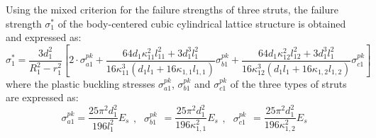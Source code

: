 \documentclass{article} %
\begin{document}
Using the mixed criterion for the failure strengths of three struts, the failure strength $\sigma _{1}^{*} $ of the body-centered cubic cylindrical lattice structure is obtained and expressed as:
\begin{equation} \label{GrindEQ__26_} 
\sigma _{1}^{*} =\frac{3d_{1}^{2} }{R_{1}^{2} -r_{1}^{2} } \left[2\cdot \sigma _{a1}^{pk} +\frac{64d_{1} \kappa _{11}^{2} l_{11}^{2} +3d_{1}^{3} l_{1}^{2} }{16\kappa _{11}^{3} \left(d_{1} l_{1} +16\kappa _{1,1} l_{1,1} \right)} \sigma _{b1}^{pk} +\frac{64d_{1} \kappa _{12}^{2} l_{12}^{2} +3d_{1}^{3} l_{1}^{2} }{16\kappa _{12}^{3} \left(d_{1} l_{1} +16\kappa _{1,2} l_{1,2} \right)} \sigma _{c1}^{pk} \right] 
\end{equation} 
where the plastic buckling stresses $\sigma _{a1}^{pk} $, $\sigma _{b1}^{pk} $ and $\sigma _{c1}^{pk} $ of the three types of struts are expressed as:
\[\sigma _{a1}^{pk} =\frac{25\pi ^{2} d_{1}^{2} }{196l_{1}^{2} } E_{s} \begin{array}{cc} {,} & {\sigma _{b1}^{pk} } \end{array}=\frac{25\pi ^{2} d_{1}^{2} }{196\kappa _{1,1}^{2} } E_{s} \begin{array}{cc} {,} & {\sigma _{c1}^{pk} } \end{array}=\frac{25\pi ^{2} d_{1}^{2} }{196\kappa _{1,2}^{2} } E_{s} \] 
\end{document}
